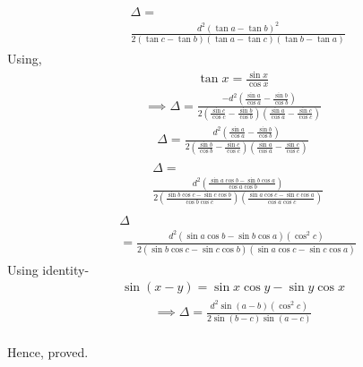 \documentclass[journal,12pt,twocolumn]{IEEEtran}
\renewcommand\thesection{\arabic{section}}
\begin{document}
\begin{enumerate}[label=\thesection.\arabic*.,ref=\thesection.\theenumi]
\begin{align}
\begin{split}
&\Delta=
\\&\frac{d^2{(\tan a-\tan b)}^2}{2(\tan c-\tan b)(\tan a-\tan c)(\tan b-\tan a)}
\end{split}
\end{align}
Using,
\begin{align}
\tan x=\frac{\sin x}{\cos x}
\end{align}
\begin{align}
\implies\Delta=\frac{-d^2({\frac{\sin a}{\cos a}-\frac{\sin b}{\cos b}})}{2({\frac{\sin c}{\cos c}-\frac{\sin b}{\cos b}})({\frac{\sin a}{\cos a}-\frac{\sin c}{\cos c}})}
\end{align}
\begin{align}
\Delta=\frac{d^2({\frac{\sin a}{\cos a}-\frac{\sin b}{\cos b}})}{2({\frac{\sin b}{\cos b}-\frac{\sin c}{\cos c}})({\frac{\sin a}{\cos a}-\frac{\sin c}{\cos c}})}
\end{align}
\begin{align}
\begin{split}
&\Delta=\\&\frac{d^2({\frac{\sin a \cos b-\sin b \cos a}{\cos a\cos b}})}{2({\frac{\sin b \cos c-\sin c \cos b}{\cos b\cos c}})({\frac{\sin a \cos c-\sin c \cos a}{\cos a\cos c}})}
\end{split}
\end{align}
\begin{align}
\begin{split}
&\Delta\\&=\frac{d^2(\sin a \cos b-\sin b \cos a)(\cos^{2} c)}{2(\sin b \cos c-\sin c \cos b)(\sin a \cos c-\sin c \cos a)}
\end{split}
\end{align}
Using identity-
\begin{align}
\sin{(x-y)}=\sin x \cos y-\sin y \cos x
\end{align}
\begin{align}
\implies\Delta=\frac{d^2\sin (a-b)(\cos^{2} c)}{2\sin (b-c)\sin(a-c)}
\end{align}\\
Hence, proved.
\end{enumerate}
\end{document}
